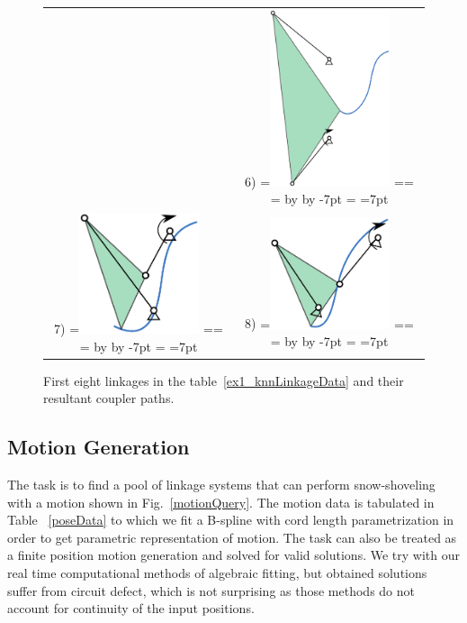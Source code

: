 \documentclass[twocolumn,10pt]{asme2ej}
\makeatletter
\newcommand{\putindeepbox}[2][0.7\baselineskip]{{%
    \setbox0=\hbox{#2}%
    \setbox0=\vbox{\noindent\hsize=\wd0\unhbox0}
    \@tempdima=\dp0
    \advance\@tempdima by \ht0
    \advance\@tempdima by -#1\relax
    \dp0=\@tempdima
    \ht0=#1\relax
    \box0
}}
\makeatother
\begin{document}
\begin{figure}
\begin{tabular}{cc}
    & 6)\putindeepbox[7pt]{\includegraphics[width=100pt]{figure/path_solutions/path_sol6.eps}} \\
  7)\putindeepbox[7pt]{\includegraphics[width=100pt]{figure/path_solutions/path_sol7.eps}}
    & 8)\putindeepbox[7pt]{\includegraphics[width=100pt]{figure/path_solutions/path_sol8.eps}}\\
\end{tabular}
\caption{First eight linkages in the table~\ref{ex1_knnLinkageData} and their resultant coupler paths.}
\label{ex1_solns}
\end{figure}

\subsection{Motion Generation}
The task is to find a pool of linkage systems that can perform snow-shoveling with a motion shown in Fig.~\ref{motionQuery}.
The motion data is tabulated in Table ~\ref{poseData} to which we fit a B-spline with cord length parametrization in order to get parametric representation of motion.
The task can also be treated as a finite position motion generation and solved for valid solutions.
We try with our real time computational methods of algebraic fitting\cite{generalfitting-JCISE},\cite{deshpande2017} but obtained solutions suffer from circuit defect, which is not surprising as those methods do not account for continuity of the input positions.
\end{document}
